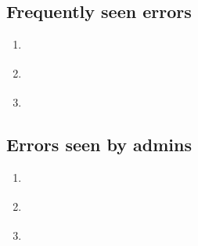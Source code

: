 \documentclass[letterpaper,10pt,english]{sphinxmanual}
\begin{document}
\subsection{Frequently seen errors}
\label{\detokenize{admin/troubleshoot:frequently-seen-errors}}\begin{enumerate}
%
\item {} 
\sphinxAtStartPar
{\hyperref[\detokenize{admin/troubleshoot:init-creds-etype-nosupp}]{}}

\item {} 
\sphinxAtStartPar
{\hyperref[\detokenize{admin/troubleshoot:cert-chain-etype-nosupp}]{}}

\item {} 
\sphinxAtStartPar
{\hyperref[\detokenize{admin/troubleshoot:err-cert-chain-cert-expired}]{}}

\end{enumerate}


\subsection{Errors seen by admins}
\label{\detokenize{admin/troubleshoot:errors-seen-by-admins}}\label{\detokenize{admin/troubleshoot:prop-failed-start}}\begin{enumerate}
%
\item {} 
\sphinxAtStartPar
{\hyperref[\detokenize{admin/troubleshoot:kprop-no-route}]{}}

\item {} 
\sphinxAtStartPar
{\hyperref[\detokenize{admin/troubleshoot:kprop-con-refused}]{}}

\item {} 
\sphinxAtStartPar
{\hyperref[\detokenize{admin/troubleshoot:kprop-sendauth-exchange}]{}}

\end{enumerate}
\label{\detokenize{admin/troubleshoot:prop-failed-end}}
\end{document}

